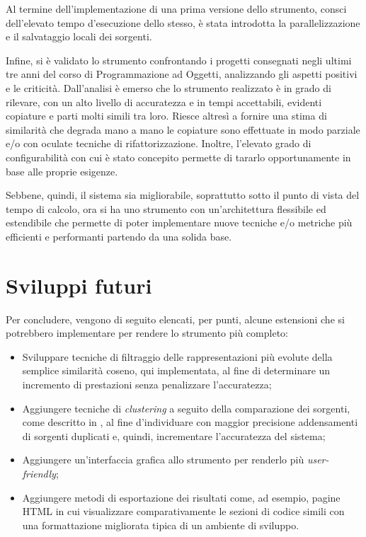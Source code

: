 Al termine dell'implementazione di una prima versione dello strumento, consci dell'elevato tempo d'esecuzione dello stesso, è stata introdotta la parallelizzazione e il salvataggio locali dei sorgenti.

Infine, si è validato lo strumento confrontando i progetti consegnati negli ultimi tre anni del corso di Programmazione ad Oggetti, analizzando gli aspetti positivi e le criticità. 
%
Dall'analisi è emerso che lo strumento realizzato è in grado di rilevare, con un alto livello di accuratezza e in tempi accettabili, evidenti copiature e parti molti simili tra loro.
%
Riesce altresì a fornire una stima di similarità che degrada mano a mano le copiature sono effettuate in modo parziale e/o con oculate tecniche di rifattorizzazione.
%
Inoltre, l'elevato grado di configurabilità con cui è stato concepito permette di tararlo opportunamente in base alle proprie esigenze.

Sebbene, quindi, il sistema sia migliorabile, soprattutto sotto il punto di vista del tempo di calcolo, ora si ha uno strumento con un'architettura flessibile ed estendibile che permette di poter implementare nuove tecniche e/o metriche più efficienti e performanti partendo da una solida base.

\section{Sviluppi futuri}
Per concludere, vengono di seguito elencati, per punti, alcune estensioni che si potrebbero implementare per rendere lo strumento più completo:
\begin{itemize}
    \item Sviluppare tecniche di filtraggio delle rappresentazioni più evolute della semplice similarità coseno, qui implementata, al fine di determinare un incremento di prestazioni senza penalizzare l'accuratezza;
    \item Aggiungere tecniche di \textit{clustering} a seguito della comparazione dei sorgenti, come descritto in \cite{pdectet}, al fine d'individuare con maggior precisione addensamenti di sorgenti duplicati e, quindi, incrementare l'accuratezza del sistema;
    \item Aggiungere un'interfaccia grafica allo strumento per renderlo più \textit{user-friendly};
    \item Aggiungere metodi di esportazione dei risultati come, ad esempio, pagine HTML in cui visualizzare comparativamente le sezioni di codice simili con una formattazione migliorata tipica di un ambiente di sviluppo.
\end{itemize}
